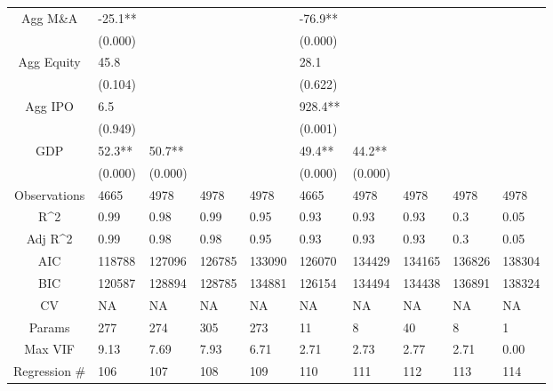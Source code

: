 \documentclass{article}
\begin{document}
\begin{table}[H]
\begin{tabular}{|clllllllll|}
  Agg M\&A & -25.1** &  &  &  & -76.9** &  &  &  &  \\ 
   & (0.000) &  &  &  & (0.000) &  &  &  &  \\ 
  Agg Equity & 45.8 &  &  &  & 28.1 &  &  &  &  \\ 
   & (0.104) &  &  &  & (0.622) &  &  &  &  \\ 
  Agg IPO & 6.5 &  &  &  & 928.4** &  &  &  &  \\ 
   & (0.949) &  &  &  & (0.001) &  &  &  &  \\ 
  GDP & 52.3** & 50.7** &  &  & 49.4** & 44.2** &  &  &  \\ 
   & (0.000) & (0.000) &  &  & (0.000) & (0.000) &  &  &  \\ 
  \hline 
 Observations & 4665 & 4978 & 4978 & 4978 & 4665 & 4978 & 4978 & 4978 & 4978 \\ 
  R^2 & 0.99 & 0.98 & 0.99 & 0.95 & 0.93 & 0.93 & 0.93 & 0.3 & 0.05 \\ 
  Adj R^2 & 0.99 & 0.98 & 0.98 & 0.95 & 0.93 & 0.93 & 0.93 & 0.3 & 0.05 \\ 
  AIC & 118788 & 127096 & 126785 & 133090 & 126070 & 134429 & 134165 & 136826 & 138304 \\ 
  BIC & 120587 & 128894 & 128785 & 134881 & 126154 & 134494 & 134438 & 136891 & 138324 \\ 
  CV & NA & NA & NA & NA & NA & NA & NA & NA & NA \\ 
  Params & 277 & 274 & 305 & 273 & 11 & 8 & 40 & 8 & 1 \\ 
  Max VIF & 9.13 & 7.69 & 7.93 & 6.71 & 2.71 & 2.73 & 2.77 & 2.71 & 0.00 \\ 
  Regression \# & 106 & 107 & 108 & 109 & 110 & 111 & 112 & 113 & 114 \\ 
   \hline
\end{tabular}
 
\end{table}
\end{document}
